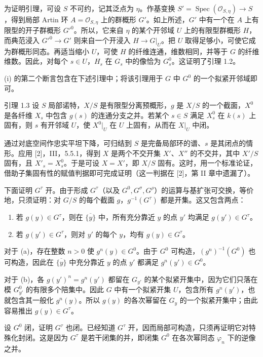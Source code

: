 为证明引理，可设 $S$ 不可约，记其泛点为 $\eta$。作基变换 $S'=\operatorname{Spec}(\mathcal O_{S,\eta})\to S$，得到局部 Artin 环 $A=\mathcal O_{S,\eta}$ 上的群概形 $G'$。如上所述，$G'$ 中有一个在 $A$ 上有限型的开子群概形 $G'^0$。所以，它来自 $\eta$ 的某个开邻域 $U$ 上的有限型群概形 $H$，而典范浸入 $G'^0\to G'$ 则来自一个开浸入
$H\to G|_U$。把 $U$ 取得足够小，可使它成为群概形同态。再适当缩小 $U$，可使 $H$ 的纤维连通，维数相同，并等于 $G$ 的纤维维数。因此，对每个 $s\in U$，$H_s$ 在 $G_s$ 中的像恰为 $G_s^0$。这证明了引理 1.2。

(i) 的第二个断言包含在下述引理中；将该引理用于 $G$ 中 $G^0$ 的一个拟紧开邻域即可。

\begin{statement}{引理 1.3}
设 $S$ 局部诺特，$X/S$ 是有限型分离预概形，$g$ 是 $X/S$ 的一个截面，$X^0$ 是各纤维 $X_s$ 中包含 $g(s)$ 的连通分支之并。若某个 $s\in S$ 满足 $X_s^0$ 在 $k(s)$ 上固有，则 $s$ 有开邻域 $U$，使 $X^0|_U$ 在 $U$ 上固有，从而在 $X|_U$ 中闭。
\end{statement}

通过对底空间作忠实平坦下降，可归结到 $S$ 是完备局部环的谱、$s$ 是其闭点的情形。应用 [2]，III，5.5.1，得到 $X$ 是两个不交开集 $X'$、$X''$ 的不交并，其中 $X'/S$ 固有，且 $X'_s=X_s^0$。于是可设 $X=X'$，即 $X/S$ 固有。这时，用一个标准论证，借助子集固有性的赋值判据即可完成证明（这一判据在 [2]，第 II 章中遗漏了）。

下面证明 $G^\tau$ 开。由于形成 $G^\tau$（以及 $G^0,G^\sigma,G^\rho$）的运算与基扩张可交换，等价地，只须证明：对 $G/S$ 的每个截面 $g$，$g^{-1}(G^\tau)$ 都是开集。这又包含两点：
\begin{enumerate}
\item[a.] 若 $g(y)\in G^\tau$，则在 $\overline{\{y\}}$ 中，所有充分靠近 $y$ 的点 $y'$ 均满足 $g(y')\in G^\tau$。
\item[b.] 若 $g(y')\in G^\tau$，则对 $y'$ 的每个 $y$，均有 $g(y)\in G^\tau$。
\end{enumerate}
对于 (a)，存在整数 $n>0$ 使 $g^n(y)\in G^0$。由于 $G^0$ 可构造，$(g^n)^{-1}(G^0)$ 也可构造，因此在 $\overline{\{y\}}$ 中充分靠近 $y$ 的点 $y'$ 都满足 $g^n(y')\in G^0$。

对于 (b)，各 $g(y')^n=g^n(y')$ 都留在 $G_{y'}$ 的某个拟紧开集中，因为它们只落在模 $G_{y'}^0$ 的有限多个陪集中。因此 $G$ 中有一个拟紧开集 $U$，包含所有 $g^n(y')$，也就包含其一般化 $g^n(y)$。所以 $g(y)$ 的各次幂留在 $G_y$ 的一个拟紧开集中；由此容易推出 $g(y)\in G^\tau$。

设 $G^0$ 闭，证明 $G^\tau$ 也闭。已经知道 $G^\tau$ 开，因而局部可构造，只须再证明它对特殊化封闭。这是因为 $G^\tau$ 是若干闭集的并，即闭集 $G^0$ 在各次幂同态 $\varphi_n$ 下的逆像之并。

